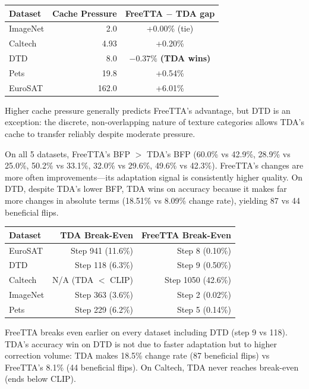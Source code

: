 \documentclass[12pt,a4paper]{article}
\newcommand{\1}{\mathbf{1}}
\begin{document}
\begin{tcolorbox}[findingbox, title={Finding 2: Cache pressure correlates with FreeTTA's advantage (with one exception).}]
\begin{center}
\begin{tabular}{lrc}
\toprule
Dataset & Cache Pressure & FreeTTA $-$ TDA gap \\
\midrule
ImageNet & 2.0   & +0.00\% (tie) \\
Caltech  & 4.93  & +0.20\% \\
DTD      & 8.0   & $\mathbf{-0.37\%}$ \textbf{(TDA wins)} \\
Pets     & 19.8  & +0.54\% \\
EuroSAT  & 162.0 & +6.01\% \\
\bottomrule
\end{tabular}
\end{center}
Higher cache pressure generally predicts FreeTTA's advantage, but DTD is an exception: the discrete, non-overlapping nature of texture categories allows TDA's cache to transfer reliably despite moderate pressure.
\end{tcolorbox}

\begin{tcolorbox}[findingbox, title={Finding 3: BFP consistently favours FreeTTA.}]
On all 5 datasets, FreeTTA's BFP $>$ TDA's BFP (60.0\% vs 42.9\%, 28.9\% vs 25.0\%, 50.2\% vs 33.1\%, 32.0\% vs 29.6\%, 49.6\% vs 42.3\%).
FreeTTA's changes are more often improvements---its adaptation signal is consistently higher quality.
On DTD, despite TDA's lower BFP, TDA wins on accuracy because it makes far more changes in absolute terms (18.51\% vs 8.09\% change rate), yielding 87 vs 44 beneficial flips.
\end{tcolorbox}

\begin{tcolorbox}[findingbox, title={Finding 4: FreeTTA adapts faster on all datasets.}]
\begin{center}
\begin{tabular}{lrr}
\toprule
Dataset & TDA Break-Even & FreeTTA Break-Even \\
\midrule
EuroSAT  & Step 941  (11.6\%) & Step 8   (0.10\%) \\
DTD      & Step 118  (6.3\%)  & Step 9   (0.50\%) \\
Caltech  & N/A (TDA $<$ CLIP) & Step 1050 (42.6\%) \\
ImageNet & Step 363  (3.6\%)  & Step 2   (0.02\%) \\
Pets     & Step 229  (6.2\%)  & Step 5   (0.14\%) \\
\bottomrule
\end{tabular}
\end{center}
FreeTTA breaks even earlier on every dataset including DTD (step 9 vs 118).
TDA's accuracy win on DTD is not due to faster adaptation but to higher correction volume:
TDA makes 18.5\% change rate (87 beneficial flips) vs FreeTTA's 8.1\% (44 beneficial flips).
On Caltech, TDA never reaches break-even (ends below CLIP).
\end{tcolorbox}
\end{document}
